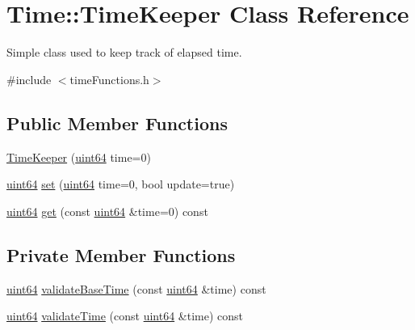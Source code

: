 \hypertarget{classTime_1_1TimeKeeper}{}\section{Time\+:\+:Time\+Keeper Class Reference}
\label{classTime_1_1TimeKeeper}


Simple class used to keep track of elapsed time.  




{\ttfamily \#include $<$time\+Functions.\+h$>$}

\subsection*{Public Member Functions}
\begin{DoxyCompactItemize}
\item 
\hyperlink{classTime_1_1TimeKeeper_a578a506c1bf462e199a259442380a16c}{Time\+Keeper} (\hyperlink{systemDefines_8h_abc0f5bc07737e498f287334775dff2b6}{uint64} time=0)
\item 
\hyperlink{systemDefines_8h_abc0f5bc07737e498f287334775dff2b6}{uint64} \hyperlink{classTime_1_1TimeKeeper_a3495ee4c92a5c4540a6a223c0cc6eeed}{set} (\hyperlink{systemDefines_8h_abc0f5bc07737e498f287334775dff2b6}{uint64} time=0, bool update=true)
\item 
\hyperlink{systemDefines_8h_abc0f5bc07737e498f287334775dff2b6}{uint64} \hyperlink{classTime_1_1TimeKeeper_a1cb3ff75c82149d1d8fc19bd91d0dec7}{get} (const \hyperlink{systemDefines_8h_abc0f5bc07737e498f287334775dff2b6}{uint64} \&time=0) const
\end{DoxyCompactItemize}
\subsection*{Private Member Functions}
\begin{DoxyCompactItemize}
\item 
\hyperlink{systemDefines_8h_abc0f5bc07737e498f287334775dff2b6}{uint64} \hyperlink{classTime_1_1TimeKeeper_a033210ff55b364ea2cb409506b988bc2}{validate\+Base\+Time} (const \hyperlink{systemDefines_8h_abc0f5bc07737e498f287334775dff2b6}{uint64} \&time) const
\item 
\hyperlink{systemDefines_8h_abc0f5bc07737e498f287334775dff2b6}{uint64} \hyperlink{classTime_1_1TimeKeeper_a83b58d0e6cbeae53fadf2b1cdf6dfa5d}{validate\+Time} (const \hyperlink{systemDefines_8h_abc0f5bc07737e498f287334775dff2b6}{uint64} \&time) const
\end{DoxyCompactItemize}
